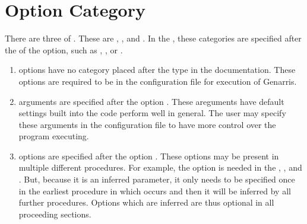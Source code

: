 \documentclass[letterpaper,10pt,english]{sphinxmanual}
\begin{document}
\section{Option Category}
\label{\detokenize{index:option-category}}\label{\detokenize{index:category}}
There are three  of . These are ,
, and . In the , these categories
are specified after the  of the option, such as , , or .
\begin{enumerate}
%
\item {} 
 options have no category placed after the type in the
documentation. These options are required to be in the configuration
file for execution of Genarris.

\item {} 
 arguments are specified after the option .
These areguments have default settings built into the code perform
well in general. The user may specify these  arguments
in the configuration file to have more control over the program
executing.

\item {} 
 options are specified after the option . These options
may be present in multiple different procedures. For example, the option
 is needed in the ,
, and .
But, because it is an inferred parameter, it only needs to be specified
once in the earliest procedure in which occurs and then it will be
inferred by all further procedures. Options which are inferred are thus
optional in all proceeding sections.

\end{enumerate}
\end{document}
